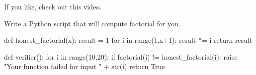 \documentclass{ximera}
\begin{document}
If you like, check out this video.




\begin{exploration}
Write a Python script that will compute factorial for you.
\begin{python}
def honest_factorial(x):
  result = 1
  for i in range(1,x+1):
    result *= i
  return result

def verifier():
  for i in range(10,20):
    if factorial(i) != honest_factorial(i):
      raise "Your function failed for input " + str(i)
  return True
\end{python}
\end{exploration}
\end{document}
